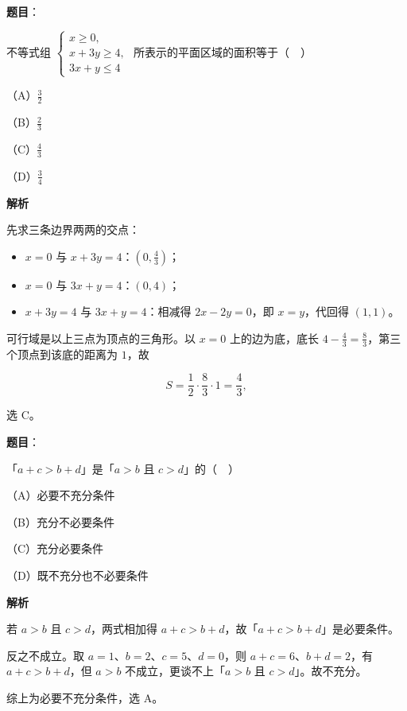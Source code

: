 \begin{answer}

\textbf{题目}：

不等式组 $\begin{cases}x\geqslant0,\\ x+3y\geqslant4,\\ 3x+y\leqslant4\end{cases}$ 所表示的平面区域的面积等于（　）

（A）$\frac32$

（B）$\frac23$

（C）$\frac43$

（D）$\frac34$

\textbf{解析}

先求三条边界两两的交点：

\begin{itemize}
\item $x=0$ 与 $x+3y=4$：$(0,\frac43)$；
\item $x=0$ 与 $3x+y=4$：$(0,4)$；
\item $x+3y=4$ 与 $3x+y=4$：相减得 $2x-2y=0$，即 $x=y$，代回得 $(1,1)$。
\end{itemize}

可行域是以上三点为顶点的三角形。以 $x=0$ 上的边为底，底长 $4-\frac43=\frac83$，第三个顶点到该底的距离为 $1$，故

\nopagebreak[4]
\[S=\frac12\cdot\frac83\cdot1=\frac43,\]

选 C。


\end{answer}
\begin{answer}

\textbf{题目}：

「$a+c>b+d$」是「$a>b$ 且 $c>d$」的（　）

（A）必要不充分条件

（B）充分不必要条件

（C）充分必要条件

（D）既不充分也不必要条件

\textbf{解析}

若 $a>b$ 且 $c>d$，两式相加得 $a+c>b+d$，故「$a+c>b+d$」是必要条件。

反之不成立。取 $a=1$、$b=2$、$c=5$、$d=0$，则 $a+c=6$、$b+d=2$，有 $a+c>b+d$，但 $a>b$ 不成立，更谈不上「$a>b$ 且 $c>d$」。故不充分。

综上为必要不充分条件，选 A。


\end{answer}
